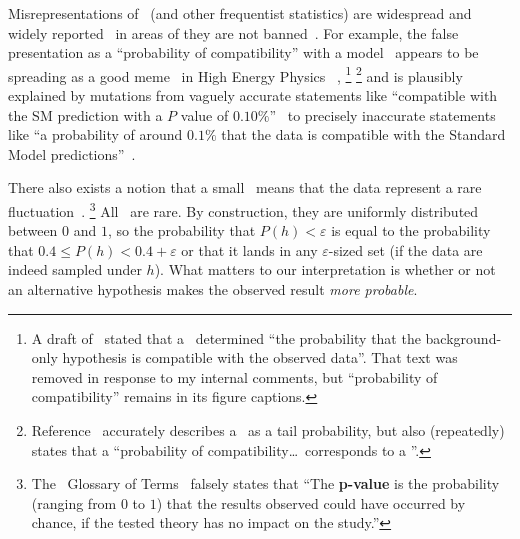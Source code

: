 Misrepresentations of \pvalues\ (and other frequentist statistics) are
widespread and widely reported~\cite{
schervish1996p,
Cohen1994TheEI,
Amrhein2017TheEI,
goodman2008dirty,
greenland2016no,
Bernstein2016princess,
wagenmakers2007practical
}
in areas of they are not banned~\cite{Trafimow2015ban}.
For example, the false presentation as a ``probability of compatibility'' with
a model~\cite{HIGG-2018-04} appears to be spreading as a good
meme~\cite{dawkins1989selfish} in High Energy Physics ~\cite{
HIGG-2017-09,
HIGG-2018-27,
HIGG-2018-51,
EXOT-2018-08,
HION-2018-19,
mastrandrea2019searches,
white2019search,
langford2021combination,
IceCube2013search,
IceCube2014searches,
gerasimov2021new
},%
\footnote{%
A draft of~\cite{HIGG-2018-51} stated that a \pvalue\ determined
``the probability that the background-only hypothesis is compatible with the
observed data''.
That text was removed in response to my internal comments, but
``probability of compatibility'' remains in its figure captions.%
}%
\footnote{%
Reference~\cite{HIGG-2018-57} accurately describes a \pvalue\ as a tail
probability, but also (repeatedly) states that a
``probability of compatibility\ldots\ corresponds to a \pvalue''.%
}%
and is plausibly explained by mutations from vaguely accurate statements like
``compatible with the SM prediction with a $P$ value of $0.10\%$''~\cite{
lhcb2021test
}
to precisely inaccurate statements like
``a probability of around $0.1\%$ that the data is compatible with the
Standard Model predictions''~\cite{cern2021test}.

There also exists a notion that a small \pvalue\ means that the data
represent a rare fluctuation~\cite{murray1997use, atlas2022pvalue}.%
\footnote{%
The \atlas\ Glossary of Terms~\cite{atlas2022pvalue} falsely states that
``The \textbf{p-value} is the probability (ranging from $0$ to $1$) that the
results observed could have occurred by chance, if the tested theory has no
impact on the study.''%
}
All \pvalues\ are rare.
By construction, they are uniformly distributed between $0$ and $1$, so the
probability that $P(h) < \varepsilon$ is equal to the probability that
$0.4 \leq P(h) < 0.4 + \varepsilon$ or that it lands in any
$\varepsilon$-sized set
(if the data are indeed sampled under $h$).
What matters to our interpretation is whether or not an alternative hypothesis
makes the observed result \emph{more probable}.


